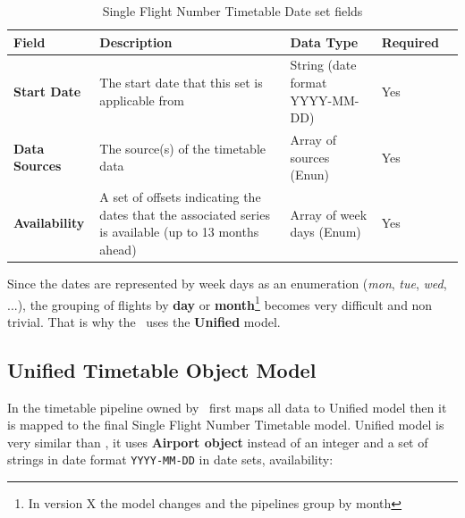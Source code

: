 \begin{table}[H]
\centering
\begin{tabular}{|>{\raggedright\arraybackslash}p{2cm}|>{\raggedright\arraybackslash}p{4cm}|>{\raggedright\arraybackslash}p{3cm}|>{\raggedright\arraybackslash}p{2cm}|>{\raggedright\arraybackslash}p{1.2cm}|}
\hline
\textbf{Field}        & \textbf{Description}                                                                                  & \textbf{Data Type}              & \textbf{Required} \\ \hline
\textbf{Start Date}   & The start date that this set is applicable from                                                       & String (date format YYYY-MM-DD) & Yes               \\ \hline
\textbf{Data Sources} & The source(s) of the timetable data                                                                   & Array of sources (Enun)         & Yes               \\ \hline
\textbf{Availability} & A set of offsets indicating the dates that the associated series is available (up to 13 months ahead) & Array of week days (Enum)       & Yes               \\ \hline
\end{tabular}
\caption{Single Flight Number Timetable Date set fields}
\label{sfn-date-set}
\end{table}

Since the dates are represented by week days as an enumeration (\textit{mon}, \textit{tue}, \textit{wed}, ...), the grouping of flights by \textbf{day} or \textbf{month}\footnote{In version X the model changes and the pipelines group by month} becomes very difficult and non trivial. That is why the \thesis\ uses the \textbf{Unified} model.

\subsection{Unified Timetable Object Model}

In the timetable pipeline owned by \squad\ first maps all data to Unified model then it is mapped to the final Single Flight Number Timetable model. Unified model is very similar than , it uses \textbf{Airport object} instead of an integer and a set of strings in date format \texttt{YYYY-MM-DD} in date sets, availability:

